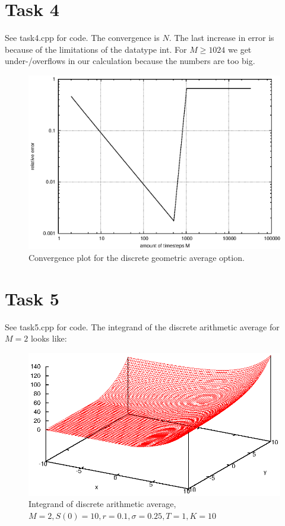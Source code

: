\documentclass[]{article}
\begin{document}
\section*{Task 4} See task4.cpp for code. The convergence
is $N$. The last increase in error is because of the limitations of
the datatype int. For $M\ge 1024$ we get under-/overflows in our calculation
because the numbers are too big.
\begin{figure}[!ht]
\centering
\includegraphics[width=.9\textwidth]{task4.eps}
\caption{Convergence plot for the discrete geometric average option.}
\label{fig:Task4}
\end{figure}
\clearpage

\section*{Task 5} See task5.cpp for code. The
integrand of the discrete arithmetic average for $M=2$ looks like:\\
\begin{figure}[!ht]
\centering
\includegraphics[width=.9\textwidth]{task5_1}
\caption{Integrand of discrete arithmetic average, $M=2,S(0)=10,r=0.1,\sigma=0.25,T=1,K=10$}
\label{fig:Task5}
\end{figure}
\clearpage
\end{document}
